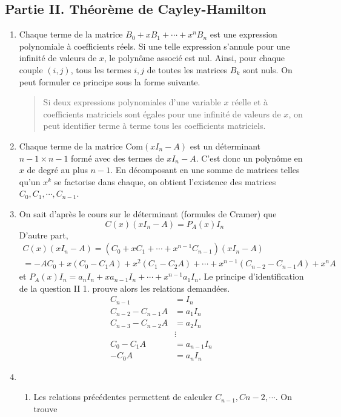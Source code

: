 \subsection*{Partie II. Th{\'e}or{\`e}me de Cayley-Hamilton}
\begin{enumerate}
\item Chaque terme de la matrice $B_0+xB_1+\cdots+x^nB_n$ est une expression polynomiale {\`a} coefficients r{\'e}els. Si une telle expression s'annule pour une infinit{\'e} de valeurs de $x$, le polyn{\^o}me associ{\'e} est nul. Ainsi, pour chaque couple $(i,j)$, tous les termes $i,j$ de toutes les matrices $B_k$ sont nuls. On peut formuler ce principe sous la forme suivante.
\begin{quote}
    Si deux expressions polynomiales d'une variable $x$ r{\'e}elle et {\`a} coefficients matriciels sont {\'e}gales pour une infinit{\'e} de valeurs de $x$, on peut identifier terme {\`a} terme tous les coefficients matriciels.
\end{quote}
\item Chaque terme de la matrice $\mathrm{Com}(xI_n-A)$ est un d{\'e}terminant $n-1\times n-1$ form{\'e} avec des termes de $xI_n-A$. C'est donc un polyn{\^o}me en $x$ de degr{\'e} au plus $n-1$. En d{\'e}composant en une somme de matrices telles qu'un $x^k$ se factorise dans chaque, on  obtient l'existence des matrices $C_0,C_1,\cdots,C_{n-1}$.
\item On sait d'apr{\`e}s le cours sur le d{\'e}terminant (formules de Cramer) que
\[C(x)(xI_n-A)=P_A(x)I_n\]
D'autre part,
\begin{multline*}
  C(x)(xI_n-A) = \left ( C_0+xC_1+\cdots +x^{n-1}C_{n-1}\right )(xI_n-A)\\
= -AC_0+x(C_0-C_1A)+x^2(C_1-C_2A)+\cdots +x^{n-1}(C_{n-2}-C_{n-1}A)+x^nA
\end{multline*}
et $P_A(x)I_n=a_nI_n+xa_{n-1}I_n + \cdots +x^{n-1}a_1I_n$.
Le principe d'identification de la question II 1. prouve alors les
relations demand{\'e}es.
\begin{align*}
  C_{n-1}&= I_n\\
C_{n-2}-C_{n-1}A &= a_1I_n\\
C_{n-3}-C_{n-2}A &= a_2I_n\\
&\vdots&\\
C_{0}-C_{1}A &= a_{n-1}I_n\\
-C_{0}A &= a_nI_n
\end{align*}
\item \begin{enumerate}
  \item Les relations pr{\'e}c{\'e}dentes permettent de calculer $C_{n-1},C{n-2},\cdots$. On trouve

\end{enumerate}
\end{enumerate}
